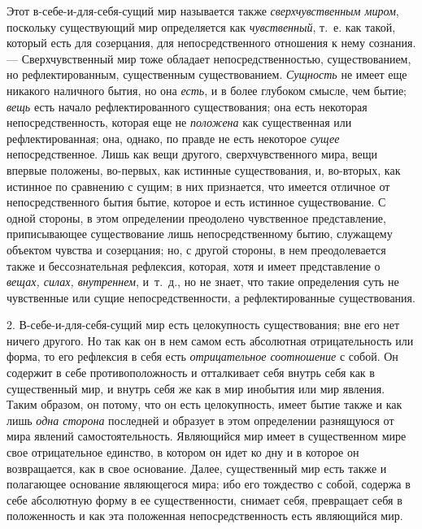 Этот в-себе-и-для-себя-сущий мир называется также
{\em сверхчувственным миром}, поскольку существующий
мир определяется как {\em чувственный}, т.~е. как
такой, который есть для созерцания, для непосредственного отношения к нему
сознания. — Сверхчувственный мир тоже обладает непосредственностью,
существованием, но рефлектированным, существенным существованием.
{\em Сущность} не имеет еще никакого наличного бытия,
но она {\em есть}, и в более глубоком смысле, чем
бытие; {\em вещь} есть начало рефлектированного
существования; она есть некоторая непосредственность, которая еще не
{\em положена} как существенная или рефлектированная;
она, однако, по правде не есть некоторое {\em сущее}
непосредственное. Лишь как вещи другого, сверхчувственного мира, вещи
впервые положены, во-первых, как истинные существования, и, во-вторых, как
истинное по сравнению с сущим; в них признается, что имеется отличное от
непосредственного бытия бытие, которое и есть истинное существование. С
одной стороны, в этом определении преодолено чувственное представление,
приписывающее существование лишь непосредственному бытию, служащему
объектом чувства и созерцания; но, с другой стороны, в нем преодолевается
также и бессознательная рефлексия, которая, хотя и имеет представление о
{\em вещах, силах, внутреннем}, и~т.~д., но не знает,
что такие определения суть не чувственные или сущие непосредственности, а
рефлектированные существования.

2. В-себе-и-для-себя-сущий мир есть целокупность существования; вне его нет
ничего другого. Но так как он в нем самом есть абсолютная отрицательность
или форма, то его рефлексия в себя есть
{\em отрицательное соотношение} с собой. Он содержит в
себе противоположность и отталкивает себя внутрь себя как в существенный
мир, и внутрь себя же как в мир инобытия или мир явления. Таким образом, он
потому, что он есть целокупность, имеет бытие также и как лишь
{\em одна сторона} последней и образует в этом
определении разнящуюся от мира явлений самостоятельность. Являющийся мир
имеет в существенном мире свое отрицательное единство, в котором он идет ко
дну и в которое он возвращается, как в свое основание. Далее, существенный
мир есть также и полагающее основание являющегося мира; ибо его тождество с
собой, содержа в себе абсолютную форму в ее существенности, снимает себя,
превращает себя в положенность и как эта положенная непосредственность есть
являющийся мир.

